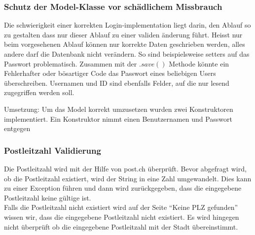 \documentclass[10pt]{article}
\begin{document}
\subsubsection{Schutz der Model-Klasse vor sch\"{a}dlichem Missbrauch}
Die schwierigkeit einer korrekten Login-implementation liegt darin, den Ablauf so zu gestalten dass nur dieser Ablauf zu einer validen \"{a}nderung f\"{u}hrt. Heisst nur beim vorgesehenen Ablauf k\"{o}nnen nur korrekte Daten geschrieben werden, alles andere darf die Datenbank nicht ver\"{a}ndern. So sind beispielsweise setters auf das Passwort problematisch. Zusammen mit der $.save()$ Methode k\"{o}nnte ein Fehlerhafter oder b\"{o}sartiger Code das Passwort eines beliebigen Users \"{u}berschreiben. Usernamen und ID sind ebenfalls Felder, auf die nur lesend zugegriffen werden soll.

Umsetzung:
Um das Model korrekt umzusetzen wurden zwei Konstruktoren implementiert. Ein Konstruktor nimmt einen Benutzernamen und Passwort entgegen

\subsubsection{Postleitzahl Validierung}
Die Postleitzahl wird mit der Hilfe von post.ch überprüft. Bevor abgefragt wird, ob die Postleitzahl existiert, wird der String in eine Zahl umgewandelt. Dies kann zu einer Exception führen und dann wird zurückgegeben, dass die eingegebene Postleitzahl keine gültige ist.\\
Falls die Postleitzahl nicht existiert wird auf der Seite ``Keine PLZ gefunden'' wissen wir, dass die eingegebene Postleitzahl nicht existiert. Es wird hingegen nicht überprüft ob die eingegebene Postleitzahl mit der Stadt übereinstimmt.

\end{document}
